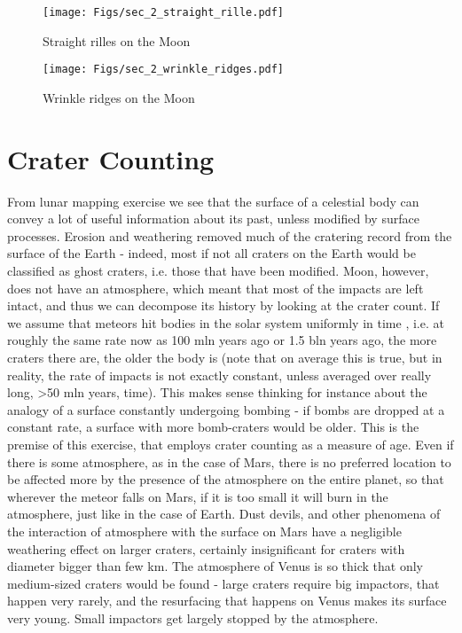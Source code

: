 \documentclass[paper=a4, fontsize=11pt]{scrartcl} %
\numberwithin{equation}{section} %
\begin{document}
\begin{figure*}
\centering
	\texttt{[image: Figs/sec\_2\_straight\_rille.pdf]}
	\caption[StraightRille]{Straight rilles on the Moon}
	\label{fig:StraightRille}
\end{figure*}

\begin{figure*}
\centering
	\texttt{[image: Figs/sec\_2\_wrinkle\_ridges.pdf]}
	\caption[Wrinkles]{Wrinkle ridges on the Moon}
	\label{fig:Wrinkles}
\end{figure*}


\newpage 



\section{Crater Counting }

From lunar mapping exercise we see that the surface of a celestial body can convey a lot of useful
information about its past, unless modified by surface processes. Erosion and weathering
removed much of the cratering record from the surface of the Earth - indeed, most if not all craters on the Earth would be classified as ghost craters, i.e. those that have been modified.  Moon, however, does not
have an atmosphere, which meant that most of the impacts are left intact, and thus we can
decompose its history by looking at the crater count. If we assume that meteors hit bodies in the
solar system uniformly in time , i.e. at roughly the same rate now as 100 mln years ago or
1.5 bln years ago, the more craters there are, the older the body is (note that on average this is true, but in reality, the rate of impacts is not exactly constant, unless averaged over really long,  >50 mln years, time). This makes sense thinking for instance about the analogy of a surface constantly undergoing bombing - if bombs
are dropped at a constant rate, a surface with more bomb-craters would be older. This is the
premise of this exercise, that employs crater counting as a measure of age. Even if there is
some atmosphere, as in the case of Mars, there is no preferred location to be affected more
by the presence of the atmosphere on the entire planet, so that wherever the meteor falls on
Mars, if it is too small it will burn in the atmosphere, just like in the case of Earth. Dust devils,
and other phenomena of the interaction of atmosphere with the surface on Mars have a
negligible weathering effect on larger craters, certainly insignificant for craters with diameter
bigger than few km. The atmosphere of  Venus is so thick that only medium-sized craters would be found   - large craters require big impactors, that happen very rarely, and the resurfacing that happens on Venus makes its surface very young.  Small impactors get largely stopped by the atmosphere. 
\end{document}
